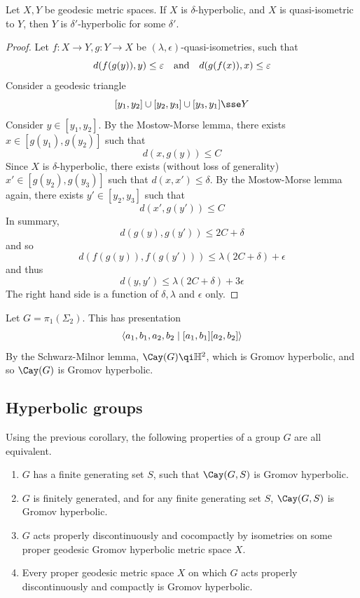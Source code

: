 \documentclass{article}
\begin{document}
\begin{corollary}
    Let \(X, Y\) be geodesic metric spaces. If \(X\) is \(\delta\)-hyperbolic, and \(X\) is quasi-isometric to \(Y\), then \(Y\) is \(\delta'\)-hyperbolic for some \(\delta'\).
\end{corollary}

\begin{proof}
    Let \(f : X \to Y, g : Y \to X\) be \((\lambda, \epsilon)\)-quasi-isometries, such that
    \[d(f(g(y)), y) \le \epsilon \qqtext{and}d(g(f(x)), x) \le \epsilon\]
    Consider a geodesic triangle
    \[[y_1, y_2] \cup [y_2, y_3] \cup [y_3, y_1] \sse Y\]
    Consider \(y \in [y_1, y_2]\). By the Mostow-Morse lemma, there exists \(x \in [g(y_1), g(y_2)]\) such that
    \[d(x, g(y)) \le C\]
    Since \(X\) is \(\delta\)-hyperbolic, there exists (without loss of generality) \(x' \in [g(y_2), g(y_3)]\) such that \(d(x, x') \le \delta\). By the Mostow-Morse lemma again, there exists \(y' \in [y_2, y_3]\) such that 
    \[d(x', g(y')) \le C\]
    In summary,
    \[d(g(y), g(y')) \le 2C + \delta\]
    and so
    \[d(f(g(y)), f(g(y'))) \le \lambda(2C + \delta) + \epsilon\]
    and thus
    \[d(y, y') \le \lambda(2C + \delta) + 3\epsilon\]
    The right hand side is a function of \(\delta, \lambda\) and \(\epsilon\) only.
\end{proof}

\begin{example}
    Let \(G = \pi_1(\Sigma_2)\). This has presentation
    \[\left\langle a_1, b_1, a_2, b_2 \mid [a_1, b_1][a_2, b_2] \right\rangle\]
    By the Schwarz-Milnor lemma, \(\Cay(G) \qi \bb H^2\), which is Gromov hyperbolic, and so \(\Cay(G)\) is Gromov hyperbolic.
\end{example}

\subsection{Hyperbolic groups}

Using the previous corollary, the following properties of a group \(G\) are all equivalent.
\begin{enumerate}
    \item \(G\) has a finite generating set \(S\), such that \(\Cay(G, S)\) is Gromov hyperbolic.
    \item \(G\) is finitely generated, and for any finite generating set \(S\), \(\Cay(G, S)\) is Gromov hyperbolic.
    \item \(G\) acts properly discontinuously and cocompactly by isometries on some proper geodesic Gromov hyperbolic metric space \(X\).
    \item Every proper geodesic metric space \(X\) on which \(G\) acts properly discontinuously and compactly is Gromov hyperbolic.
\end{enumerate}
\end{document}
